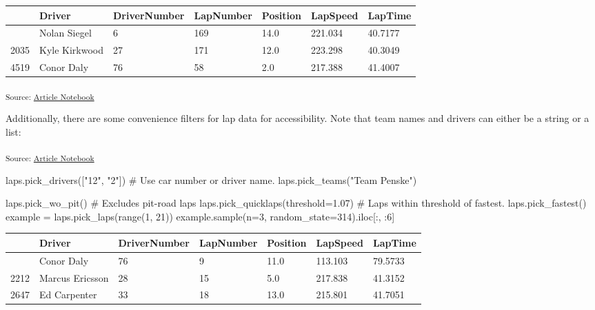 \documentclass[
  10pt]{article}
\newenvironment{Shaded}{\begin{snugshade}}{\end{snugshade}}
\newcommand{\BuiltInTok}[1]{\textcolor[rgb]{0.00,0.23,0.31}{#1}}
\newcommand{\CommentTok}[1]{\textcolor[rgb]{0.37,0.37,0.37}{#1}}
\newcommand{\DecValTok}[1]{\textcolor[rgb]{0.68,0.00,0.00}{#1}}
\newcommand{\FloatTok}[1]{\textcolor[rgb]{0.68,0.00,0.00}{#1}}
\newcommand{\NormalTok}[1]{\textcolor[rgb]{0.00,0.23,0.31}{#1}}
\newcommand{\OperatorTok}[1]{\textcolor[rgb]{0.37,0.37,0.37}{#1}}
\newcommand{\StringTok}[1]{\textcolor[rgb]{0.13,0.47,0.30}{#1}}
\newcounter{none} %
\begin{document}
{\def\LTcaptype{none} %
\begin{longtable}[]{@{}lllllll@{}}
\toprule\noalign{}
& Driver & DriverNumber & LapNumber & Position & LapSpeed & LapTime \\
\midrule\noalign{}
\endhead
\bottomrule\noalign{}
\endlastfoot
3438 & Nolan Siegel & 6 & 169 & 14.0 & 221.034 & 40.7177 \\
2035 & Kyle Kirkwood & 27 & 171 & 12.0 & 223.298 & 40.3049 \\
4519 & Conor Daly & 76 & 58 & 2.0 & 217.388 & 41.4007 \\
\end{longtable}
}

\textsubscript{Source:
\href{https://ArchithSharma.github.io/raceindycar_manuscript/index.qmd.html}{Article
Notebook}}

Additionally, there are some convenience filters for lap data for
accessibility. Note that team names and drivers can either be a string
or a list:

\textsubscript{Source:
\href{https://ArchithSharma.github.io/raceindycar_manuscript/index.qmd.html}{Article
Notebook}}

\begin{Shaded}
\begin{Highlighting}[]
\NormalTok{laps.pick\_drivers([}\StringTok{"12"}\NormalTok{, }\StringTok{"2"}\NormalTok{])  }\CommentTok{\# Use car number or driver name.}
\NormalTok{laps.pick\_teams(}\StringTok{"Team Penske"}\NormalTok{)}

\NormalTok{laps.pick\_wo\_pit()  }\CommentTok{\# Excludes pit{-}road laps}
\NormalTok{laps.pick\_quicklaps(threshold}\OperatorTok{=}\FloatTok{1.07}\NormalTok{)  }\CommentTok{\# Laps within threshold of fastest.}
\NormalTok{laps.pick\_fastest()}
\NormalTok{example }\OperatorTok{=}\NormalTok{ laps.pick\_laps(}\BuiltInTok{range}\NormalTok{(}\DecValTok{1}\NormalTok{, }\DecValTok{21}\NormalTok{))}
\NormalTok{example.sample(n}\OperatorTok{=}\DecValTok{3}\NormalTok{, random\_state}\OperatorTok{=}\DecValTok{314}\NormalTok{).iloc[:, :}\DecValTok{6}\NormalTok{]}
\end{Highlighting}
\end{Shaded}

{\def\LTcaptype{none} %
\begin{longtable}[]{@{}lllllll@{}}
\toprule\noalign{}
& Driver & DriverNumber & LapNumber & Position & LapSpeed & LapTime \\
\midrule\noalign{}
\endhead
\bottomrule\noalign{}
\endlastfoot
4554 & Conor Daly & 76 & 9 & 11.0 & 113.103 & 79.5733 \\
2212 & Marcus Ericsson & 28 & 15 & 5.0 & 217.838 & 41.3152 \\
2647 & Ed Carpenter & 33 & 18 & 13.0 & 215.801 & 41.7051 \\
\end{longtable}
}
\end{document}
